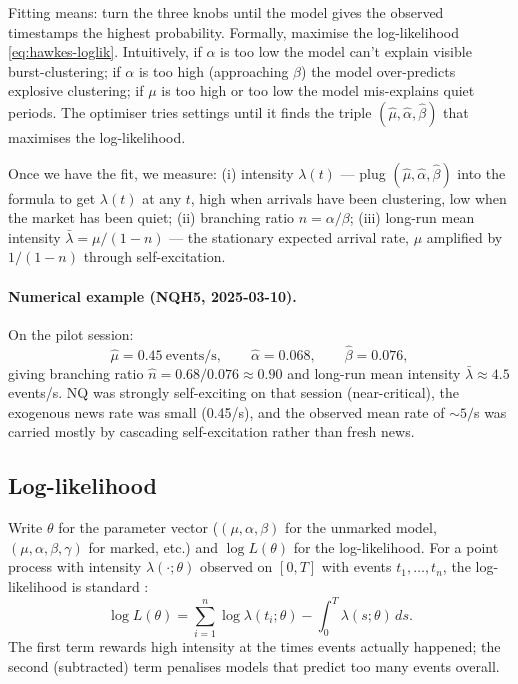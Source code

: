 Fitting means: turn the three knobs until the model gives the observed timestamps the highest probability. Formally, maximise the log-likelihood \eqref{eq:hawkes-loglik}. Intuitively, if $\alpha$ is too low the model can't explain visible burst-clustering; if $\alpha$ is too high (approaching $\beta$) the model over-predicts explosive clustering; if $\mu$ is too high or too low the model mis-explains quiet periods. The optimiser tries settings until it finds the triple $(\hat\mu, \hat\alpha, \hat\beta)$ that maximises the log-likelihood.

Once we have the fit, we measure: (i) intensity $\lambda(t)$ --- plug $(\hat\mu, \hat\alpha, \hat\beta)$ into the formula to get $\lambda(t)$ at any $t$, high when arrivals have been clustering, low when the market has been quiet; (ii) branching ratio $n = \alpha/\beta$; (iii) long-run mean intensity $\bar\lambda = \mu/(1 - n)$ --- the stationary expected arrival rate, $\mu$ amplified by $1/(1 - n)$ through self-excitation.

\paragraph{Numerical example (NQH5, 2025-03-10).} On the pilot session:
$$\hat\mu = 0.45\ \text{events/s}, \qquad \hat\alpha = 0.068, \qquad \hat\beta = 0.076,$$
giving branching ratio $\hat n = 0.68/0.076 \approx 0.90$ and long-run mean intensity $\bar\lambda \approx 4.5$ events/s. NQ was strongly self-exciting on that session (near-critical), the exogenous news rate was small (0.45/s), and the observed mean rate of $\sim 5/$s was carried mostly by cascading self-excitation rather than fresh news.

\subsection{Log-likelihood}
\label{app:mle-loglik}

Write $\theta$ for the parameter vector ($(\mu, \alpha, \beta)$ for the unmarked model, $(\mu, \alpha, \beta, \gamma)$ for marked, etc.) and $\log L(\theta)$ for the log-likelihood. For a point process with intensity $\lambda(\cdot; \theta)$ observed on $[0, T]$ with events $t_1, \ldots, t_n$, the log-likelihood is standard \citep{ozaki1979}:
\begin{equation}
\log L(\theta) = \sum_{i=1}^n \log \lambda(t_i; \theta) - \int_0^T \lambda(s; \theta)\, ds.
\label{eq:hawkes-loglik}
\end{equation}
The first term rewards high intensity at the times events actually happened; the second (subtracted) term penalises models that predict too many events overall.

